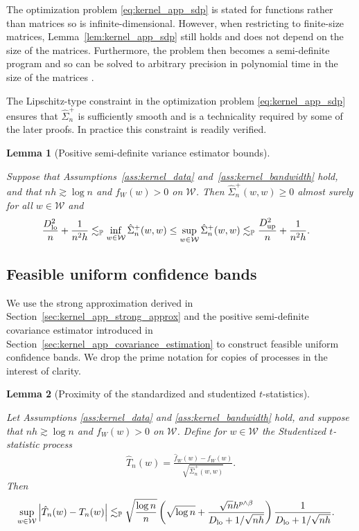 \documentclass[11pt,lof]{puthesis}
\renewcommand{\P}{\ensuremath{\mathbb{P}}}
\newcommand{\cW}{\ensuremath{\mathcal{W}}}
\newcommand{\Dl}{\ensuremath{D_{\textup{lo}}}}
\newcommand{\Du}{\ensuremath{D_{\textup{up}}}}
\theoremstyle{break}
\newtheorem{lemma}{Lemma}[section]
\theoremstyle{proof}
\begin{document}
The optimization problem \eqref{eq:kernel_app_sdp} is stated for functions
rather than
matrices so is infinite-dimensional. However, when restricting to finite-size
matrices, Lemma~\ref{lem:kernel_app_sdp} still holds and does not depend on the
size
of the matrices. Furthermore, the problem then becomes a semi-definite program
and so can be solved to arbitrary precision in polynomial time in the size of
the matrices \citep{laurent2005semidefinite}.

The Lipschitz-type constraint in the optimization problem
\eqref{eq:kernel_app_sdp}
ensures that $\hat \Sigma_n^+$ is sufficiently smooth and is a technicality
required by some of the later proofs. In practice this constraint is readily
verified.

\begin{lemma}[Positive semi-definite variance estimator bounds]
\label{lem:kernel_app_variance_estimator_bounds}

Suppose that Assumptions~\ref{ass:kernel_data}
and~\ref{ass:kernel_bandwidth} hold, and that
$n h \gtrsim \log n$ and $f_W(w) > 0$ on $\cW$.
Then $\hat \Sigma_n^+(w,w) \geq 0$
almost surely for all $w \in \cW$ and
%
\begin{align*}
\frac{\Dl^2}{n} + \frac{1}{n^2h}
&\lesssim_\P
\inf_{w \in \cW} \hat \Sigma_n^+(w,w)
\leq
\sup_{w \in \cW} \hat \Sigma_n^+(w,w)
\lesssim_\P
\frac{\Du^2}{n} + \frac{1}{n^2h}.
\end{align*}

\end{lemma}

\subsection{Feasible uniform confidence bands}

We use the strong approximation derived in
Section~\ref{sec:kernel_app_strong_approx} and the
positive semi-definite covariance estimator introduced in
Section~\ref{sec:kernel_app_covariance_estimation} to construct feasible
uniform
confidence bands. We drop the prime notation for copies of processes
in the interest of clarity.

\begin{lemma}[Proximity of the standardized and studentized $t$-statistics]
\label{lem:kernel_app_studentized_t_statistic}

Let Assumptions \ref{ass:kernel_data} and
\ref{ass:kernel_bandwidth} hold, and suppose that
$n h \gtrsim \log n$ and $f_W(w) > 0$ on $\cW$.
Define for $w \in \cW$
the Studentized $t$-statistic process
%
\begin{align*}
\hat T_n(w) = \frac{\hat f_W(w) - f_W(w)}
{\sqrt{\hat\Sigma_n^+(w,w)}}.
\end{align*}
%
Then
%
\begin{align*}
\sup_{w \in \cW}
\left| \hat T_n(w) - T_n(w) \right|
&\lesssim_\P
\sqrt{\frac{\log n}{n}}
\left(
\sqrt{\log n} + \frac{\sqrt n h^{p \wedge \beta}}
{\Dl + 1/\sqrt{n h}}
\right)
\frac{1}{\Dl + 1/\sqrt{n h}}.
\end{align*}

\end{lemma}
\end{document}
